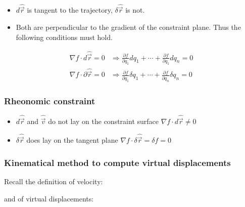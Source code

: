 \documentclass[10pt,a4paper]{scrartcl}
\begin{document}
\begin{multicols*}{2}
\begin{itemize}
\item $d\hat{\vec{r}}$ is tangent to the trajectory, $\delta\hat{\vec{r}}$ is not.
\end{itemize}


\begin{itemize}
\item  Both are perpendicular to the gradient of the constraint plane. Thus the following conditions must hold.
\end{itemize}

\begin{align*}
\nabla f\cdot d\hat{\vec{r}}=0&\Rightarrow\frac{\partial f}{\partial q_1}dq_1+\cdots+\frac{\partial f}{\partial q_1}dq_n=0\\
\nabla f\cdot \partial\hat{\vec{r}}=0&\Rightarrow\frac{\partial f}{\partial q_1}\delta q_1+\cdots+\frac{\partial f}{\partial q_n}\delta q_n =0
\end{align*}

\subsubsection{Rheonomic constraint}

\begin{itemize}
\item $d\hat{\vec{r}}$ and $\hat{\vec{v}}$ do not lay on the constraint surface $\nabla f\cdot d\hat{\vec{r}}\neq 0$
\item $\delta\hat{\vec{r}}$ does lay on the tangent plane  $\nabla f\cdot \delta\hat{\vec{r}}=\delta f=0$
\end{itemize}

\subsubsection{Kinematical method to compute virtual displacements}

Recall the definition of velocity:


and of virtual displacements:



\end{multicols*}
\end{document}
